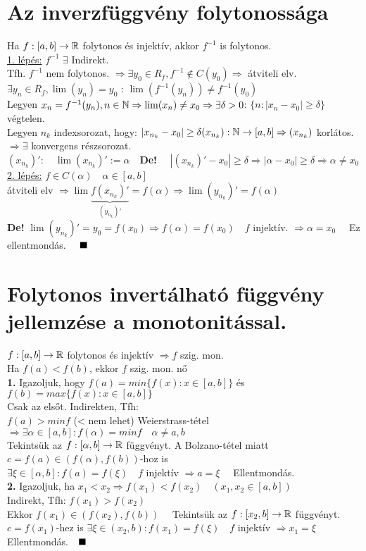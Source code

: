 \documentclass[a4paper,11pt]{article}
\begin{document}
\section{Az inverzfüggvény folytonossága}
\tetel Ha $f:[a,b]\to\mathbb{R}$ folytonos és injektív, akkor $f^{-1}$ is folytonos.\\[0.1cm]
\biz \underline{1. lépés:} $f^{-1}$  $\exists$ Indirekt.\\[0.1cm] Tfh. $f^{-1}$ nem
folytonos. $\Rightarrow\exists y_{0}\in R_f, f^{-1}\notin C(y_0)\Rightarrow$
átviteli elv.\\[0.1cm] $\exists y_n\in R_f,\lim(y_n)=y_0$ : $\lim(f^{-1}(y_n))\neq
f^{-1}(y_0)$\\[0.1cm] Legyen $x_n=f^{-1}(y_n),n\in\mathbb{N}\Rightarrow\lim(x_n)\neq
x_0\Rightarrow\exists\delta>0$: $\{n:|x_n-x_0|\geq\delta\}$ végtelen.\\[0.1cm]
Legyen $n_k$ indexsorozat, hogy: $|x_{n_k}-x_0|\geq\delta\\[0.1cm](x_{n_k}):
\mathbb{N}\to[a,b]\Rightarrow(x_{n_k})$ korlátos. $\Rightarrow\exists$ konvergens
részsorozat.\\[0.1cm] $(x_{n_k})':\quad\lim(x_{n_k})':=\alpha\quad$\textbf{De!}
$\quad|(x_{n_k})'-x_0|\geq\delta\Rightarrow|\alpha-x_0|\geq\delta\Rightarrow\alpha
\neq x_0$\\[0.1cm]\underline{2. lépés:} $f\in C(\alpha)\quad\alpha\in[a,b]$\\[0.1cm]
átviteli elv $\Rightarrow\lim\underbrace{f(x_{n_k})'}_{(y_{n_k})'}=
f(\alpha)\Rightarrow\lim(y_{n_k})'=f(\alpha)$\\[0.1cm]\textbf{De!}
$\lim(y_{n_k})'=y_0=f(x_0)\Rightarrow f(\alpha)=f(x_0)\quad f$ injektív.
$\Rightarrow\alpha=x_0\quad$ Ez ellentmondás. $\quad\blacksquare$
\newpage
\section{Folytonos invertálható függvény jellemzése a monotonitással.}
\tetel $f:[a,b]\to\mathbb{R}$ folytonos és injektív $\Rightarrow f$ szig. mon.\\[0.1cm]
\biz Ha $f(a)<f(b)$, ekkor $f$ szig. mon. nő\\[0.1cm] \textbf{1.} Igazoljuk, hogy
$f(a)=min\{f(x):x\in[a,b]\}$ és $f(b)=max\{f(x):x\in[a,b]\}$\\[0.1cm] Csak az
elsőt. Indirekten, Tfh:\\[0.1cm] $f(a)>min f$ (< nem lehet) Weierstrass-tétel
$\Rightarrow\exists\alpha\in[a,b]:f(\alpha)=min f\quad\alpha\neq a,b$\\[0.1cm]
Tekintsük az $f:[\alpha,b]\to\mathbb{R}$ függvényt. A Bolzano-tétel miatt $c=f(a)
\in(f(\alpha),f(b))$-hoz is\\[0.1cm] $\exists\xi\in[\alpha,b]:f(a)=f(\xi)\quad f$
injektív $\Rightarrow a=\xi\quad$ Ellentmondás.\\[0.1cm]\textbf{2.} Igazoljuk, ha
$x_1<x_2\Rightarrow f(x_1)<f(x_2)\quad(x_1,x_2\in[a,b])$\\[0.1cm]Indirekt, Tfh:
$f(x_1)>f(x_2)$\\[0.1cm]Ekkor $f(x_1)\in(f(x_2),f(b))\quad$ Tekintsük az $f:[x_2,b]
\to\mathbb{R}$ függvényt.\\[0.1cm]$c=f(x_1)$-hez is $\exists\xi\in(x_2,b):
f(x_1)=f(\xi)\quad f$ injektív $\Rightarrow x_1=\xi\quad$ Ellentmondás.$\quad\blacksquare$
\end{document}
